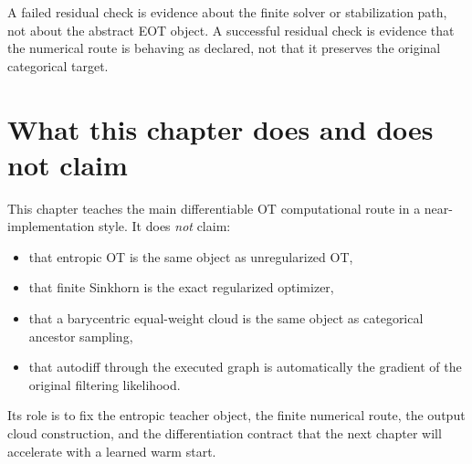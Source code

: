 A failed residual check is evidence about the finite solver or stabilization path,
not about the abstract EOT object.  A successful residual check is evidence that
the numerical route is behaving as declared, not that it preserves the original
categorical target.

\section{What this chapter does and does not claim}
\label{sec:bf-eot-boundary}

This chapter teaches the main differentiable OT computational route in a near-
implementation style.  It does \emph{not} claim:
\begin{itemize}
  \item that entropic OT is the same object as unregularized OT,
  \item that finite Sinkhorn is the exact regularized optimizer,
  \item that a barycentric equal-weight cloud is the same object as categorical
  ancestor sampling,
  \item that autodiff through the executed graph is automatically the gradient of
  the original filtering likelihood.
\end{itemize}
Its role is to fix the entropic teacher object, the finite numerical route, the
output cloud construction, and the differentiation contract that the next chapter
will accelerate with a learned warm start.

\FloatBarrier
